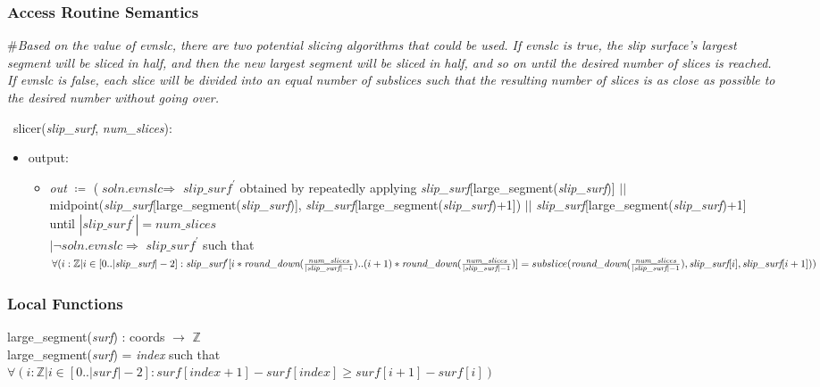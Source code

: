 \documentclass[12pt, titlepage]{article}
\begin{document}
\subsubsection{Access Routine Semantics}
\noindent \#\textit{Based on the value of evnslc, there are two potential 
slicing algorithms that could be used. If evnslc is true, the slip surface's 
largest segment will be sliced in half, and then the new largest segment will 
be sliced in half, and so on until the desired number of slices is reached. If 
evnslc is false, each slice will be divided into an equal number of 
subslices such that the resulting number of slices is as close as possible to 
the desired number without going over.}

~\newline \noindent slicer(\textit{slip\_surf}, \textit{num\_slices}):
\begin{itemize}
	\item output:
	\begin{itemize}
		\item[] \textit{out} $\coloneqq$ ($\textit{soln.evnslc} \Rightarrow$ 
		$\textit{slip\_surf}^\prime$ obtained by repeatedly applying 
		\textit{slip\_surf}[large\_segment(\textit{slip\_surf})] $||$ 
		midpoint(\textit{slip\_surf}[large\_segment(\textit{slip\_surf})], 
		\textit{slip\_surf}[large\_segment(\textit{slip\_surf})+1])
		$||$ \textit{slip\_surf}[large\_segment(\textit{slip\_surf})+1] until 
		$|\textit{slip\_surf}^\prime| = \textit{num\_slices}$ \\
		$| \lnot \textit{soln.evnslc} \Rightarrow$ $\textit{slip\_surf}^\prime$ 
		such that 
		$\forall(i : \mathbb{Z} | i \in [0..|\textit{slip\_surf}|-2] : 
		\textit{slip\_surf}^\prime[i*\textit{round\_down}(\frac{\textit{num\_slices}}
		{|\textit{slip\_surf}|-1})..(i+1)*\textit{round\_down}(\frac{\textit{num\_slices}}
		{|\textit{slip\_surf}|-1})] = \\
		subslice(\textit{round\_down}(\frac{\textit{num\_slices}}
		{|\textit{slip\_surf}|-1}), \textit{slip\_surf}[i], 
		\textit{slip\_surf}[i+1]))$
	\end{itemize}
\end{itemize}



\subsubsection{Local Functions}
large\_segment(\textit{surf}) : coords $\rightarrow$ $\mathbb{Z}$\\
large\_segment(\textit{surf}) = \textit{index} such that\\
$\forall(i : \mathbb{Z} | i \in [0..|\textit{surf}|-2] : 
\textit{surf}[\textit{index}+1] - \textit{surf}[\textit{index}] \geq 
\textit{surf}[i+1] - \textit{surf}[i])$\\
\end{document}
